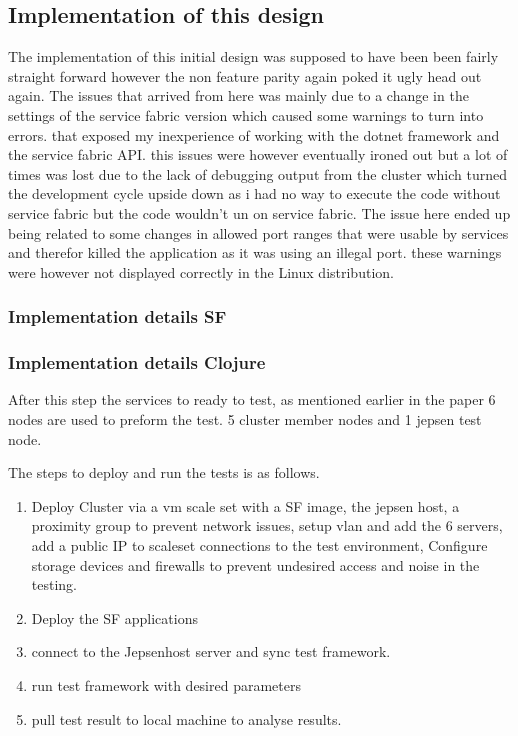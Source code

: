 \documentclass[a4paper,10pt,titlepage]{report}
\begin{document}
    \subsection{Implementation of this design}


    The implementation of this initial design was supposed to have been been fairly straight forward however the non feature parity again poked it ugly head out again. The issues that arrived from here was mainly due to a change in the settings of the service fabric version which caused some warnings to turn into errors. that exposed my inexperience of working with the dotnet framework and the service fabric API. this issues were however eventually ironed out but a lot of times was lost due to the lack of debugging output from the cluster which turned the development cycle upside down as i had no way to execute the code without service fabric but the code wouldn't un on service fabric. The issue here ended up being related to some changes in allowed port ranges that were usable by services and therefor killed the application as it was using an illegal port. these warnings were however not displayed correctly in the Linux distribution.

    \subsubsection{Implementation details SF}

    \subsubsection{Implementation details Clojure}



    After this step the services to ready to test, as mentioned earlier in the paper 6 nodes are used to preform the test. 5 cluster member nodes and 1 jepsen test node.

    The steps to deploy and run the tests is as follows.

\begin{enumerate}
    \item Deploy Cluster via a vm scale set with a SF image, the jepsen host, a proximity group to prevent network issues, setup vlan and add the 6 servers, add a public IP to scaleset connections to the test environment, Configure storage devices and firewalls to prevent undesired access and noise in the testing.
    \item Deploy the SF applications
    \item connect to the Jepsenhost server and sync test framework.
    \item run test framework with desired parameters
    \item pull test result to local machine to analyse results.
\end{enumerate}
\end{document}
